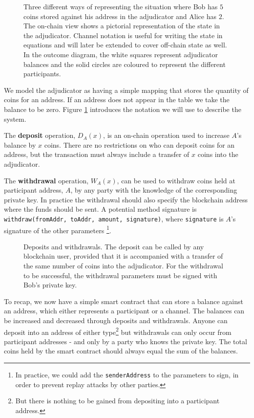 \begin{figure}[h]\centering
  \makebox[\textwidth][c]{}
  \caption{
    Three different ways of representing the situation where Bob has $5$ coins
    stored against his address in the adjudicator and Alice has $2$.
    The on-chain view shows a pictorial representation of the state in the adjudicator.
    Channel notation is useful for writing the state in equations and will later be extended to cover off-chain state as well.
    In the outcome diagram, the white squares represent adjudicator balances and the solid circles are coloured to represent the different participants.
  }\label{fig:balance-notation}
\end{figure}

We model the adjudicator as having a simple mapping that stores the quantity of coins for
an address.
If an address does not appear in the table we take the balance to be zero.
Figure \ref{fig:balance-notation} introduces the notation we will use to describe the system.

The \textbf{deposit} operation, $D_A(x)$, is an on-chain operation used to increase $A$'s balance by $x$ coins.
There are no restrictions on who can deposit coins for an address, but the
transaction must always include a transfer of $x$ coins into the adjudicator.

The \textbf{withdrawal} operation, $W_A(x)$, can be used to withdraw coins held at participant address, $A$, by any
party with the knowledge of the corresponding private key. 
In practice the withdrawal should also specify the blockchain address where the funds should be sent.
A potential method signature is \texttt{withdraw(fromAddr, toAddr, amount, signature)}, 
where \texttt{signature} is $A$'s signature of the other parameters
\footnote{In practice, we could add the \texttt{senderAddress} to the parameters to sign,
in order to prevent replay attacks by other parties.}.

\begin{figure}[h]\centering
  \makebox[\textwidth][c]{}
  \caption{
    Deposits and withdrawals.
    The deposit can be called by any blockchain user, provided that it is accompanied with a transfer of the same number of coins into the adjudicator.
    For the withdrawal to be successful, the withdrawal parameters must be signed with Bob's private key.
  }\label{fig:deposit-withdrawal}
\end{figure}

To recap, we now have a simple smart contract that can store a balance against an address, which either represents a participant or a channel.
The balances can be increased and decreased through deposits and withdrawals.
Anyone can deposit into an address of either type\footnote{But there is nothing to be gained from depositing into a participant address.} but withdrawals can only occur from 
participant addresses - and only by a party who knows the private key.
The total coins held by the smart contract should always equal the sum of the balances.

